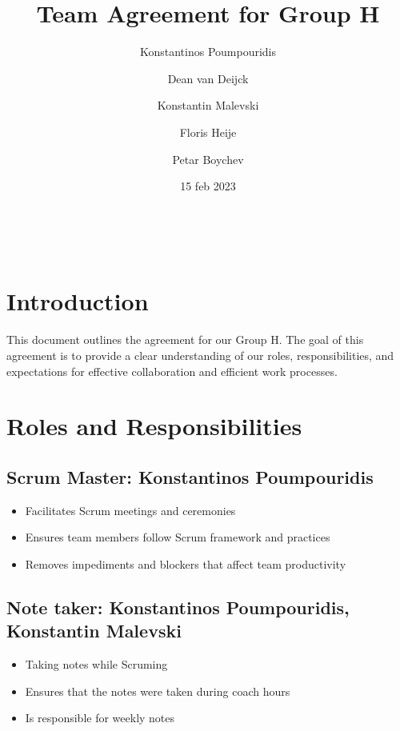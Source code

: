 \documentclass{article}
\begin{document}
\title{Team Agreement for Group H}
\author[1]{Konstantinos Poumpouridis}
\date{15 feb 2023}
\author[2]{Dean van Deijck}
\author[3]{Konstantin Malevski}
\author[4]{Floris Heije}
\author[5]{Petar Boychev}

\maketitle
\newpage

\begin{versionhistory}
\end{versionhistory}

\newpage
\section{Introduction}

This document outlines the agreement for our Group H. The goal of this agreement is to provide a clear understanding of our roles, responsibilities, and expectations for effective collaboration and efficient work processes.

\section{Roles and Responsibilities}

\subsection{Scrum Master: Konstantinos Poumpouridis}
\begin{itemize}
    \item Facilitates Scrum meetings and ceremonies
    \item Ensures team members follow Scrum framework and practices
    \item Removes impediments and blockers that affect team productivity
\end{itemize}

\subsection{Note taker: Konstantinos Poumpouridis, Konstantin Malevski}
\begin{itemize}
    \item Taking notes while Scruming
    \item Ensures that the notes were taken during coach hours
    \item Is responsible for weekly notes
\end{itemize}
\end{document}

